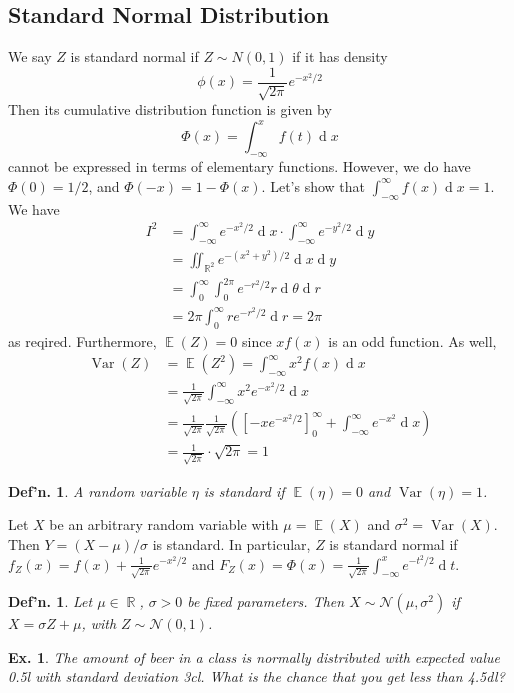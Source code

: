 \documentclass[12pt, a4paper]{book}
\DeclareMathOperator{\R}{\mathbb{R}}
\DeclareMathOperator{\E}{\mathbb{E}}
\DeclareMathOperator{\Var}{Var}
\renewcommand{\d}[1]{\ensuremath{\operatorname{d}\!{#1}}} %
\newtheorem{definition}[theorem]{Def'n.}
\newtheorem{example}[theorem]{Ex.}
\theoremstyle{nonumberplain}
\begin{document}
\subsection{Standard Normal Distribution}
We say $Z$ is standard normal if $Z\sim N(0,1)$ if it has density
\[\phi(x)=\frac{1}{\sqrt{2\pi}}e^{-x^2/2}\]
Then its cumulative distribution function is given by
\[\Phi(x)=\int_{-\infty}^x f(t)\d{x}\]
cannot be expressed in terms of elementary functions.
However, we do have $\Phi(0)=1/2$, and $\Phi(-x)=1-\Phi(x)$.
Let's show that $\int_{-\infty}^\infty f(x)\d{x}=1$.
We have
\begin{align*}
    I^2 &= \int_{-\infty}^\infty e^{-x^2/2}\d{x}\cdot\int_{-\infty}^\infty e^{-y^2/2}\d{y}\\
        &= \iint_{\R^2}e^{-(x^2+y^2)/2}\d{x}\d{y}\\
        &= \int_0^\infty\int_0^{2\pi}e^{-r^2/2}r\d{\theta}\d{r}\\
        &= 2\pi\int_0^\infty re^{-r^2/2}\d{r}=2\pi
\end{align*}
as reqired.
Furthermore, $\E(Z)=0$ since $xf(x)$ is an odd function.
As well,
\begin{align*}
    \Var(Z) &= \E(Z^2)=\int_{-\infty}^\infty x^2 f(x)\d{x}\\
            &= \frac{1}{\sqrt{2\pi}}\int_{-\infty}^\infty x^2e^{-x^2/2}\d{x}\\
            &= \frac{1}{\sqrt{2\pi}}\frac{1}{\sqrt{2\pi}}\left(\left[-xe^{-x^2/2}\right]_{0}^\infty+\int_{-\infty}^\infty e^{-x^2}\d{x}\right)\\
            &= \frac{1}{\sqrt{2\pi}}\cdot\sqrt{2\pi}=1
\end{align*}
\begin{definition}
    A random variable $\eta$ is standard if $\E(\eta)=0$ and $\Var(\eta)=1$.
\end{definition}
Let $X$ be an arbitrary random variable with $\mu=\E(X)$ and $\sigma^2=\Var(X)$.
Then $Y=(X-\mu)/\sigma$ is standard.
In particular, $Z$ is standard normal if $f_Z(x)=f(x)+\frac{1}{\sqrt{2\pi}}e^{-x^2/2}$ and $F_Z(x)=\Phi(x)=\frac{1}{\sqrt{2\pi}}\int_{-\infty}^x e^{-t^2/2}\d{t}$.
\begin{definition}
    Let $\mu\in\R$, $\sigma>0$ be fixed parameters.
    Then $X\sim\mathcal{N}(\mu,\sigma^2)$ if $X=\sigma Z+\mu$, with $Z\sim\mathcal{N}(0,1)$.
\end{definition}
\begin{example}
    The amount of beer in a class is normally distributed with expected value 0.5l with standard deviation 3cl.
    What is the chance that you get less than 4.5dl?
\end{example}
\end{document}

